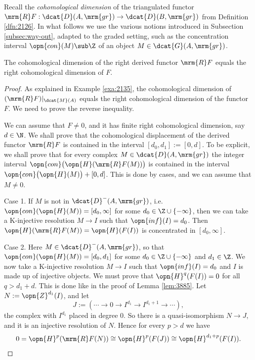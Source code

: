 Recall the 
{\em cohomological dimension}%
%
of the triangulated functor 
$\mrm{R} F : \dcat{D}(A, \mrm{gr}) \to \dcat{D}(B, \mrm{gr})$
from Definition \ref{dfn:2126}.
In what follows we use the various notions introduced in Subsection
\ref{subsec:way-out}, 
adapted to the graded setting, such as the concentration interval 
$\opn{con}(M) \sub \Z$ of an 
object $M \in \dcat{G}(A, \mrm{gr})$. 

\begin{lem} \label{lem:3891}
The cohomological dimension of the right derived functor $\mrm{R} F$
equals the right cohomological dimension of $F$. 
\end{lem}

\begin{proof}
As explained in Example \ref{exa:2135}, the cohomological dimension of 
$(\mrm{R} F)|_{\dcat{M}(A)}$ equals the right cohomological dimension of the 
functor $F$. We need to prove the reverse inequality. 

We can assume that $F \neq 0$, and it has finite right cohomological 
dimension, say $d \in \N$. We shall prove that the cohomological displacement 
of the derived functor $\mrm{R} F$ is contained in the interval
$[d_0, d_1] := [0, d]$. 
To be explicit, we shall prove that for every complex
$M \in \dcat{D}(A, \mrm{gr})$
the integer interval 
$\opn{con} \bigl( \opn{H}(\mrm{R} F(M)) \bigr)$ is contained in the interval 
$\opn{con} \bigl( \opn{H}(M) \bigr) + [0, d]$. This is done by cases, and we 
can assume that $M \neq 0$. 

\medskip \noindent 
Case 1. If $M$ is not in $\dcat{D}^-(A, \mrm{gr})$, 
i.e.\ $\opn{con}(\opn{H}(M)) = [d_0, \infty]$ for some 
$d_0 \in \Z \cup \{ -\infty \}$, then we can take a K-injective resolution 
$M \to I$ such that $\opn{inf}(I) = d_0$. Then 
$\opn{H}(\mrm{R} F(M)) = \opn{H}(F(I))$
is concentrated in $[d_0, \infty]$. 

\medskip \noindent 
Case 2. Here $M \in \dcat{D}^-(A, \mrm{gr})$, so that 
$\opn{con}(\opn{H}(M)) = [d_0, d_1]$ for some 
$d_0 \in \Z \cup \{ -\infty \}$ and $d_1 \in \Z$. 
We now take a  K-injective resolution $M \to I$ such that $\opn{inf}(I) = d_0$
and $I$ is made up of injective objects. We must prove that 
$\opn{H}^q(F(I)) = 0$ for all $q > d_1 + d$. This is done like in the 
proof of Lemma \ref{lem:3885}. 
Let $N := \opn{Z}^{d_1}(I)$, and let 
\[ J := (\cdots \to 0 \to I^{d_1} \to  I^{d_1 + 1} \to \cdots) , \]
the complex with $I^{d_1}$ placed in degree $0$. 
So there is a quasi-isomorphism $N \to J$, and it is an injective resolution of 
$N$. Hence for every $p > d$ we have
\[ 0 = \opn{H}^p(\mrm{R} F(N)) \cong \opn{H}^p(F(J)) \cong 
\opn{H}^{d_1 + p}(F(I))  . \qedhere \]
\end{proof}


